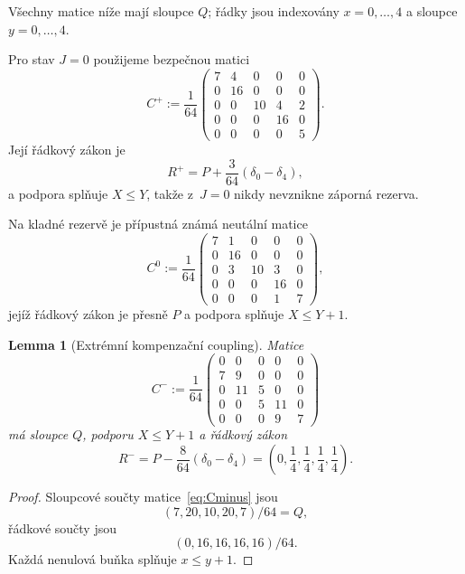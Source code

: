 \documentclass[11pt,a4paper]{article}
\newtheorem{lemma}[theorem]{Lemma}
\theoremstyle{definition}
\theoremstyle{remark}
\begin{document}
V\v sechny matice n\'i\v ze maj\'i sloupce $Q$; \v r\'adky jsou indexov\'any
$x=0,\dots,4$ a sloupce $y=0,\dots,4$.

Pro stav $J=0$ pou\v zijeme bezpe\v cnou matici
\begin{equation}
\label{eq:Cplus}
C^{+}:=\frac1{64}
\begin{pmatrix}
7&4&0&0&0\\
0&16&0&0&0\\
0&0&10&4&2\\
0&0&0&16&0\\
0&0&0&0&5
\end{pmatrix}.
\end{equation}
Jej\'i \v r\'adkov\'y z\'akon je
\[
R^{+}=P+\frac3{64}(\delta_0-\delta_4),
\]
a podpora spl\v nuje $X\le Y$, tak\v ze z~$J=0$ nikdy nevznikne z\'aporn\'a
rezerva.

Na kladn\'e rezerv\v e je p\v r\'ipustn\'a zn\'am\'a neut\'aln\'i matice
\begin{equation}
\label{eq:Czero}
C^{0}:=\frac1{64}
\begin{pmatrix}
7&1&0&0&0\\
0&16&0&0&0\\
0&3&10&3&0\\
0&0&0&16&0\\
0&0&0&1&7
\end{pmatrix},
\end{equation}
jej\'i\v z \v r\'adkov\'y z\'akon je p\v resn\v e $P$ a podpora spl\v nuje
$X\le Y+1$.

\begin{lemma}[Extr\'emn\'i kompenza\v cn\'i coupling]
\label{lem:Cminus}
Matice
\begin{equation}
\label{eq:Cminus}
C^{-}:=\frac1{64}
\begin{pmatrix}
0&0&0&0&0\\
7&9&0&0&0\\
0&11&5&0&0\\
0&0&5&11&0\\
0&0&0&9&7
\end{pmatrix}
\end{equation}
m\'a sloupce $Q$, podporu $X\le Y+1$ a \v r\'adkov\'y z\'akon
\[
\boxed{
R^{-}=P-\frac8{64}(\delta_0-\delta_4)
      =\left(0,\frac14,\frac14,\frac14,\frac14\right).
}
\]
\end{lemma}

\begin{proof}
Sloupcov\'e sou\v cty matice~\eqref{eq:Cminus} jsou
\[
(7,20,10,20,7)/64=Q,
\]
\v r\'adkov\'e sou\v cty jsou
\[
(0,16,16,16,16)/64.
\]
Ka\v zd\'a nenulov\'a bu\v nka spl\v nuje $x\le y+1$.
\end{proof}
\end{document}
